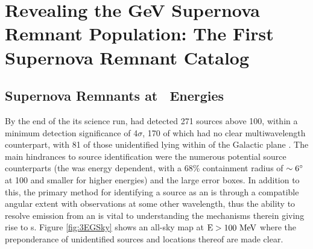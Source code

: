 \chapter{Revealing the GeV Supernova Remnant Population: The First \FermiLat{} Supernova Remnant Catalog}
\label{chap:snrcat}


\section{\label{snrCat:latGam}Supernova Remnants at \gam~Energies}

By the end of the its science run, \egret{} had detected 271 sources above 100\mev{}, within a minimum detection significance of 4$\sigma$, 170 of which had no clear multiwavelength counterpart, with 81 of those unidentified lying within \blat of the Galactic plane \citep{Hartman99}. The main hindrances to source identification were the numerous potential source counterparts (the \egret{} \psf{} was energy dependent, with a 68\% containment radius of ${\rm \sim 6 ^\circ}$ at 100\mev{} and smaller for higher energies) and the large \egret{} error boxes. In addition to this, the primary method for identifying a \gam{} source as an \snr{} is through a compatible angular extent with  observations at some other wavelength, thus the ability to resolve emission from an \snr{} is vital to understanding the mechanisms therein giving rise to \gam{}s. Figure \ref{fig:3EGSky} shows an \egret{} all-sky map at ${\rm E > 100 ~\mathrm{MeV}}$ where the preponderance of unidentified sources and locations thereof are made clear.


